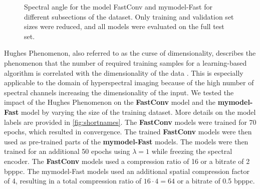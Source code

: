\begin{figure}[!ht]
    \centering
{}\datatable
{}
\caption[Comparison for Different Dataset Sizes (Spectral Angle)]{Spectral angle for the model FastConv and \ac{mymodel}-Fast for different subsections of the dataset. Only training and validation set sizes were reduced, and all models were evaluated on the full test set.}
\label{fig:hughesangle}
\end{figure}

Hughes Phenomenon, also referred to as the curse of dimensionality, describes the phenomenon that the number of required training samples for a learning-based algorithm is correlated with the dimensionality of the data \citep{hughes_mean_1968}. This is especially applicable to the domain of hyperspectral imaging because of the high number of spectral channels increasing the dimensionality of the input. We tested the impact of the Hughes Phenomenon on the \textbf{FastConv} model and the \textbf{\ac{mymodel}-Fast} model by varying the size of the training dataset. More details on the model labels are provided in \autoref{fig:shortnames}. The \textbf{FastConv} models were trained for 70 epochs, which resulted in convergence.
The trained \textbf{FastConv} models were then used as pre-trained parts of the \textbf{\ac{mymodel}-Fast} models. The models were then trained for an additional 50 epochs using $\lambda=1$ while freezing the spectral encoder. 
The \textbf{FastConv} models used a compression ratio of 16 or a bitrate of 2 \ac{bpppc}. The \ac{mymodel}-Fast models used an additional spatial compression factor of 4, resulting in a total compression ratio of $16 \cdot 4=64$ or a bitrate of 0.5 \ac{bpppc}.

